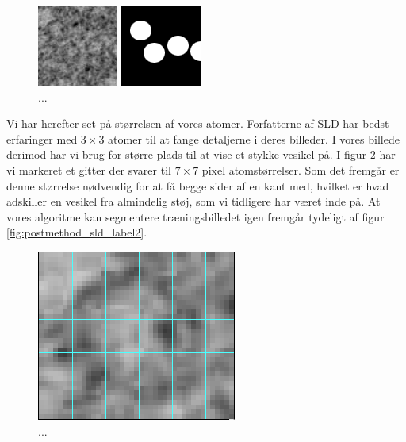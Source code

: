 \begin{figure}[H]
	\begin{minipage}[b]{0.5\linewidth}
		\centering
		\includegraphics[scale=3]{files/postmethod/img/imTrain2.png}
	\end{minipage}
	\hspace{0.5cm}
	\begin{minipage}[b]{0.5\linewidth}
		\centering
		\includegraphics[scale=3]{files/postmethod/img/imGT2.png}
	\end{minipage}
	\caption{...\label{fig:postmethod_sld_train2}}
\end{figure}

Vi har herefter set på størrelsen af vores atomer. Forfatterne af SLD har bedst erfaringer med $3\times3$ atomer til at fange detaljerne i deres billeder. I vores billede derimod har vi brug for større plads til at vise et stykke vesikel på. I figur \ref{fig:postmethod_ves_grid} har vi markeret et gitter der svarer til $7\times7$ pixel atomstørrelser. Som det fremgår er denne størrelse nødvendig for at få begge sider af en kant med, hvilket er hvad adskiller en vesikel fra almindelig støj, som vi tidligere har været inde på. %
At vores algoritme kan segmentere træningsbilledet igen fremgår tydeligt af figur \ref{fig:postmethod_sld_label2}.

\begin{figure}[H]
		\centering
		\includegraphics[scale=1]{files/postmethod/img/ves_grid.png}
	\caption{...\label{fig:postmethod_ves_grid}}
\end{figure}

